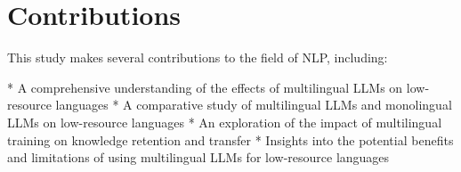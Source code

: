 \documentclass{article}
\begin{document}
\section{Contributions}

This study makes several contributions to the field of NLP, including:

* A comprehensive understanding of the effects of multilingual LLMs on low-resource languages
* A comparative study of multilingual LLMs and monolingual LLMs on low-resource languages
* An exploration of the impact of multilingual training on knowledge retention and transfer
* Insights into the potential benefits and limitations of using multilingual LLMs for low-resource languages
\end{document}

